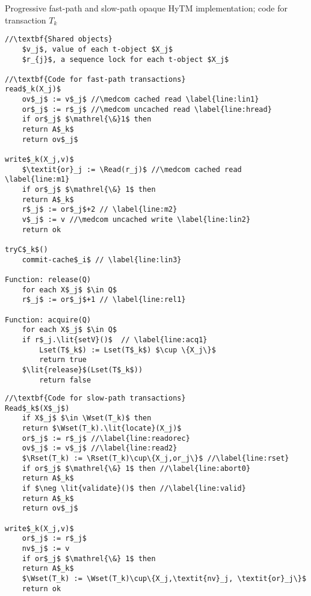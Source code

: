 \begin{algorithm*}[!ht]
\caption{Progressive fast-path and slow-path opaque HyTM implementation; code for transaction $T_k$}
\label{alg:inswrite}
\vspace{-1mm}
\noindent\lstset{style=customc}
\begin{minipage}{0.49\textwidth}
\begin{lstlisting}[frame=none,firstnumber=1,mathescape=true]
//\textbf{Shared objects}
    $v_j$, value of each t-object $X_j$ 
    $r_{j}$, a sequence lock for each t-object $X_j$

//\textbf{Code for fast-path transactions}
read$_k(X_j)$
    ov$_j$ := v$_j$ //\medcom cached read \label{line:lin1}
    or$_j$ := r$_j$ //\medcom uncached read \label{line:hread}
    if or$_j$ $\mathrel{\&}1$ then  
	return A$_k$ 
    return ov$_j$ 

write$_k(X_j,v)$
    $\textit{or}_j := \Read(r_j)$ //\medcom cached read \label{line:m1}
    if or$_j$ $\mathrel{\&} 1$ then  		
	return A$_k$ 
    r$_j$ := or$_j$+2 // \label{line:m2}
    v$_j$ := v //\medcom uncached write \label{line:lin2} 
    return ok

tryC$_k$()
    commit-cache$_i$ // \label{line:lin3}

Function: release(Q)
    for each X$_j$ $\in Q$
	r$_j$ := or$_j$+1 // \label{line:rel1}	
	
Function: acquire(Q)
    for each X$_j$ $\in Q$	
	if r$_j.\lit{setV}()$  // \label{line:acq1}
	    Lset(T$_k$) := Lset(T$_k$) $\cup \{X_j\}$
	    return true
	$\lit{release}$(Lset(T$_k$))
	    return false
\end{lstlisting}
\end{minipage}
\begin{minipage}{0.49\textwidth}
\begin{lstlisting}[frame=none,firstnumber=last,mathescape=true]
//\textbf{Code for slow-path transactions}
Read$_k$(X$_j$)
    if X$_j$ $\in \Wset(T_k)$ then
	return $\Wset(T_k).\lit{locate}(X_j)$ 
    or$_j$ := r$_j$ //\label{line:readorec}
    ov$_j$ := v$_j$ //\label{line:read2}
    $\Rset(T_k) := \Rset(T_k)\cup\{X_j,or_j\}$ //\label{line:rset}
    if or$_j$ $\mathrel{\&} 1$ then //\label{line:abort0}	
	return A$_k$
    if $\neg \lit{validate}()$ then //\label{line:valid}
	return A$_k$
    return ov$_j$

write$_k(X_j,v)$
    or$_j$ := r$_j$
    nv$_j$ := v
    if or$_j$ $\mathrel{\&} 1$ then	
	return A$_k$ 
    $\Wset(T_k) := \Wset(T_k)\cup\{X_j,\textit{nv}_j, \textit{or}_j\}$
    return ok


\end{lstlisting}
\end{minipage}
\end{algorithm*}
